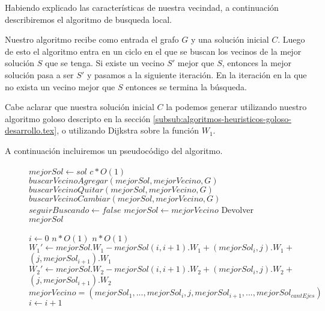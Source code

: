 Habiendo explicado las características de nuestra vecindad, a continuación describiremos el algoritmo de busqueda local.

Nuestro algoritmo recibe como entrada el grafo $G$ y una solución inicial $C$. Luego de esto el algoritmo entra en un ciclo en el que se buscan los vecinos de la mejor solución $S$ que se tenga. Si existe un vecino $S'$ mejor que $S$, entonces la mejor solución pasa a ser $S'$ y pasamos a la siguiente iteración. En la iteración en la que no exista un vecino mejor que $S$ entonces se termina la búsqueda.

Cabe aclarar que nuestra solución inicial $C$ la podemos generar utilizando nuestro algoritmo goloso descripto en la sección \ref{subsub:algoritmos-heuristicos-goloso-desarrollo.tex}, o utilizando Dijkstra sobre la función $W_1$.

A continuación incluiremos un pseudocódigo del algoritmo.
\begin{center}
 \begin{figure}[H]
  \begin{pseudo}
   \State $mejorSol \leftarrow sol$
   \hfill$c*O(1)$
      \State $buscarVecinoAgregar(mejorSol, mejorVecino, G)$
      \State $buscarVecinoQuitar(mejorSol, mejorVecino, G)$
      \State $buscarVecinoCambiar(mejorSol, mejorVecino, G)$
	\State $seguirBuscando \leftarrow false$
      \Else
	\State $mejorSol \leftarrow mejorVecino$
      \EndIf
   \EndWhile
   \State Devolver $mejorSol$
   \EndProcedure
  \end{pseudo}
 \end{figure}
\end{center}

\begin{flushleft}
 \begin{figure}[H]
  \begin{pseudo}
   \State $i \leftarrow 0$
   \hfill$n*O(1)$
      \hfill$n*O(1)$
	  \State $W_1' \leftarrow mejorSol.W_1 - mejorSol(i,i+1).W_1 + (mejorSol_i,j).W_1 + $
	  \State $(j,mejorSol_{i+1}).W_1$
	  \State $W_2' \leftarrow mejorSol.W_2 - mejorSol(i,i+1).W_2 + (mejorSol_i,j).W_2 + $
	  \State $(j,mejorSol_{i+1}).W_2$
	    \State $mejorVecino = (mejorSol_1, ... ,mejorSol_i, j, mejorSol_{i+1}, ..., mejorSol_{cantEjes})$
	  \EndIf
      \EndFor
      \State $i \leftarrow i+1$
   \EndWhile
   \EndProcedure
  \end{pseudo}
 \end{figure}
\end{flushleft}

